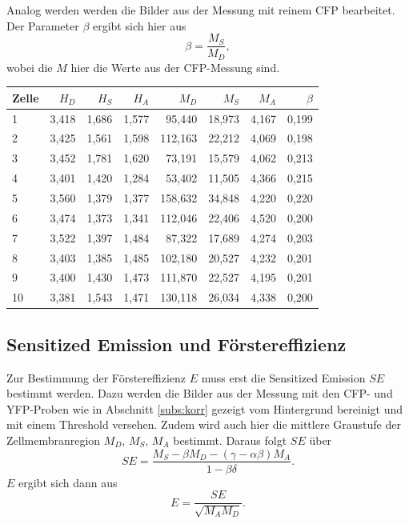 Analog werden werden die Bilder aus der Messung mit reinem CFP bearbeitet. Der Parameter $\beta$ ergibt sich hier aus
\begin{equation*}
    \beta = \frac{M_S}{M_D}, 
\end{equation*}
wobei die $M$ hier die Werte aus der CFP-Messung sind.


\begin{center}
    \centering
    \begin{tabular}{lrrrrrrr}
        \toprule
        Zelle &  $H_D$ &  $H_S$ &  $H_A$ &    $M_D$ &   $M_S$ &  $M_A$ &  $\beta$ \\
        \midrule
        1     & 3,418 & 1,686 & 1,577 &  95,440 & 18,973 & 4,167 & 0,199 \\
        2     & 3,425 & 1,561 & 1,598 & 112,163 & 22,212 & 4,069 & 0,198 \\
        3     & 3,452 & 1,781 & 1,620 &  73,191 & 15,579 & 4,062 & 0,213 \\
        4     & 3,401 & 1,420 & 1,284 &  53,402 & 11,505 & 4,366 & 0,215 \\
        5     & 3,560 & 1,379 & 1,377 & 158,632 & 34,848 & 4,220 & 0,220 \\
        6     & 3,474 & 1,373 & 1,341 & 112,046 & 22,406 & 4,520 & 0,200 \\
        7     & 3,522 & 1,397 & 1,484 &  87,322 & 17,689 & 4,274 & 0,203 \\
        8     & 3,403 & 1,385 & 1,485 & 102,180 & 20,527 & 4,232 & 0,201 \\
        9     & 3,400 & 1,430 & 1,473 & 111,870 & 22,527 & 4,195 & 0,201 \\
        10    & 3,381 & 1,543 & 1,471 & 130,118 & 26,034 & 4,338 & 0,200 \\
        \bottomrule
    \end{tabular}
    \label{tab:CFP}
\end{center}

\subsection{Sensitized Emission und Förstereffizienz}
Zur Bestimmung der Förstereffizienz $E$ muss erst die Sensitized Emission $SE$ bestimmt werden. Dazu werden die Bilder aus der 
Messung mit den CFP- und YFP-Proben wie in Abschnitt \ref{subs:korr} gezeigt vom Hintergrund bereinigt und mit einem Threshold versehen. 
Zudem wird auch hier die mittlere Graustufe der Zellmembranregion $M_D$, $M_S$, $M_A$ bestimmt. Daraus folgt $SE$ über
\begin{equation*}
    SE = \frac{M_S - \beta M_D - (\gamma - \alpha \beta) M_A}{1 - \beta \delta}.
\end{equation*}
$E$ ergibt sich dann aus 
\begin{equation*}
    E = \frac{SE}{\sqrt{M_A M_D}}.
\end{equation*}

